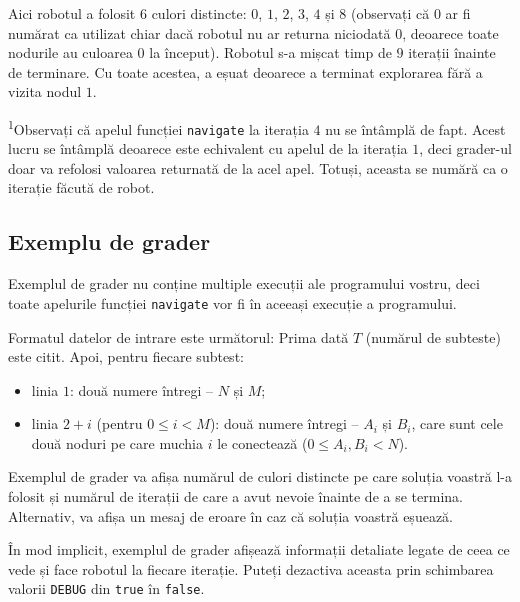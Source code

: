 \documentclass[12pt]{article}
\begin{document}
Aici robotul a folosit $6$ culori distincte: $0$, $1$, $2$, $3$, $4$ și $8$ (observați că $0$ ar fi numărat ca utilizat chiar dacă robotul nu ar returna niciodată $0$, deoarece toate nodurile au culoarea $0$ la început). Robotul s-a mișcat timp de $9$ iterații înainte de terminare. Cu toate acestea, a eșuat deoarece a terminat explorarea fără a vizita nodul $1$.

\textsuperscript{1}Observați că apelul funcției \texttt{navigate} la iterația $4$ nu se întâmplă de fapt. Acest lucru se întâmplă deoarece este echivalent cu apelul de la iterația $1$, deci grader-ul doar va refolosi valoarea returnată de la acel apel. Totuși, aceasta se numără ca o iterație făcută de robot.

\subsection{Exemplu de grader}

Exemplul de grader nu conține multiple execuții ale programului vostru, deci toate apelurile funcției \texttt{navigate} vor fi în aceeași execuție a programului.

Formatul datelor de intrare este următorul: Prima dată $T$ (numărul de subteste) este citit. Apoi, pentru fiecare subtest:
\begin{itemize}
\item linia $1$: două numere întregi -- $N$ și $M$;
\item linia $2+i$ (pentru $0 \leq i < M$): două numere întregi -- $A_i$ și $B_i$, care sunt cele două noduri pe care muchia $i$ le conectează ($0 \leq A_i, B_i < N$).
\end{itemize}

Exemplul de grader va afișa numărul de culori distincte pe care soluția voastră l-a folosit și numărul de iterații de care a avut nevoie înainte de a se termina. Alternativ, va afișa un mesaj de eroare în caz că soluția voastră eșuează.

În mod implicit, exemplul de grader afișează informații detaliate legate de ceea ce vede și face robotul la fiecare iterație. Puteți dezactiva aceasta prin schimbarea valorii \texttt{DEBUG} din \texttt{true} în \texttt{false}.
\end{document}
